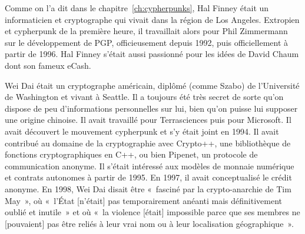Comme on l'a dit dans le chapitre~\ref{ch:cypherpunks}, Hal Finney était un informaticien et cryptographe qui vivait dans la région de Los Angeles. Extropien et cypherpunk de la première heure, il travaillait alors pour Phil Zimmermann sur le développement de PGP, officieusement depuis 1992, puis officiellement à partir de 1996. Hal Finney s'était aussi passionné pour les idées de David Chaum dont son fameux eCash. %

Wei Dai était un cryptographe américain, diplômé (comme Szabo) de l'Université de Washington et vivant à Seattle. Il a toujours été très secret de sorte qu'on dispose de peu d'informations personnelles sur lui, bien qu'on puisse lui supposer une origine chinoise. Il avait travaillé pour Terrasciences puis pour Microsoft. Il avait découvert le mouvement cypherpunk et s'y était joint en 1994. Il avait contribué au domaine de la cryptographie avec Crypto++, une bibliothèque de fonctions cryptographiques en C++, ou bien Pipenet, un protocole de communication anonyme. Il s'était intéressé aux modèles de monnaie numérique et contrats autonomes à partir de 1995. En 1997, il avait conceptualisé le crédit anonyme. En 1998, Wei Dai disait être «~fasciné par la crypto-anarchie de Tim May~», où «~l'État [n'était] pas temporairement anéanti mais définitivement oublié et inutile~» et où «~la violence [était] impossible parce que ses membres ne [pouvaient] pas être reliés à leur vrai nom ou à leur localisation géographique~».

